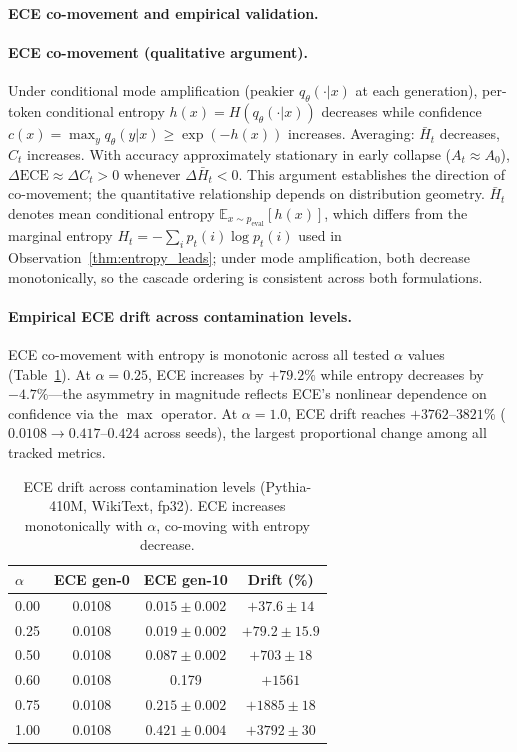 \medskip
\noindent\textbf{ECE co-movement and empirical validation.}

\paragraph{ECE co-movement (qualitative argument).}
Under conditional mode amplification (peakier $q_\theta(\cdot|x)$ at each generation), per-token conditional entropy $h(x) = H(q_\theta(\cdot|x))$ decreases while confidence $c(x) = \max_y q_\theta(y|x) \geq \exp(-h(x))$ increases.
Averaging: $\bar{H}_t$ decreases, $C_t$ increases.
With accuracy approximately stationary in early collapse ($A_t \approx A_0$), $\Delta\mathrm{ECE} \approx \Delta C_t > 0$ whenever $\Delta\bar{H}_t < 0$.
This argument establishes the direction of co-movement; the quantitative relationship depends on distribution geometry.
$\bar{H}_t$ denotes mean conditional entropy $\mathbb{E}_{x \sim p_{\text{eval}}}[h(x)]$, which differs from the marginal entropy $H_t = -\sum_i p_t(i)\log p_t(i)$ used in Observation~\ref{thm:entropy_leads}; under mode amplification, both decrease monotonically, so the cascade ordering is consistent across both formulations.

\paragraph{Empirical ECE drift across contamination levels.}
ECE co-movement with entropy is monotonic across all tested $\alpha$ values (Table~\ref{tab:ece_drift}).
At $\alpha{=}0.25$, ECE increases by $+79.2\%$ while entropy decreases by $-4.7\%$---the asymmetry in magnitude reflects ECE's nonlinear dependence on confidence via the $\max$ operator.
At $\alpha{=}1.0$, ECE drift reaches $+3762$--$3821\%$ ($0.0108 \to 0.417$--$0.424$ across seeds), the largest proportional change among all tracked metrics.

\begin{table}[H]
\centering
\small
\caption{ECE drift across contamination levels (Pythia-410M, WikiText, fp32). ECE increases monotonically with $\alpha$, co-moving with entropy decrease.}
\label{tab:ece_drift}
\begin{tabular}{lccc}
\toprule
$\alpha$ & ECE gen-0 & ECE gen-10 & Drift (\%) \\
\midrule
0.00 & 0.0108 & $0.015{\pm}0.002$ & $+37.6{\pm}14$ \\
0.25 & 0.0108 & $0.019{\pm}0.002$ & $+79.2{\pm}15.9$ \\
0.50 & 0.0108 & $0.087{\pm}0.002$ & $+703{\pm}18$ \\
0.60 & 0.0108 & 0.179 & $+1561$ \\
0.75 & 0.0108 & $0.215{\pm}0.002$ & $+1885{\pm}18$ \\
1.00 & 0.0108 & $0.421{\pm}0.004$ & $+3792{\pm}30$ \\
\bottomrule
\end{tabular}
\end{table}

